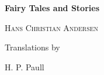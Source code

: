 \documentclass[a4paper,11pt,onesided]{report}
\begin{document}
\begin{titlepage}
    \begin{center}
        \vspace*{1cm}
 
        {\Huge  \textbf{Fairy Tales and Stories}}
 
        \vspace{0.5cm}
        {\textsc{Hans Christian Andersen}}
                   
        \vspace{1.5cm}
        
        {}

        \vspace{1.5cm}
        {Translations by}

        \vspace{0.5cm}
        {H. P. Paull}

        \vspace{0.5cm}

        \vfill
    \end{center}
 \end{titlepage}

\tableofcontents



\end{document}
